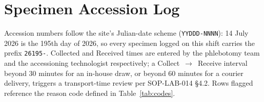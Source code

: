
\section{Specimen Accession Log}
\label{sec:log}

Accession numbers follow the site's Julian-date scheme (\texttt{YYDDD-NNNN}): 14 July 2026 is
the 195th day of 2026, so every specimen logged on this shift carries the prefix
\texttt{26195-}. Collected and Received times are entered by the phlebotomy team and the
accessioning technologist respectively; a Collect~$\to$~Receive interval beyond 30 minutes for
an in-house draw, or beyond 60 minutes for a courier delivery, triggers a transport-time review
per SOP-LAB-014 \S4.2. Rows flagged  reference the reason code defined in
Table~\ref{tab:codes}.

